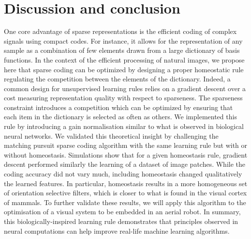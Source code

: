 \documentclass[a4paper, 11pt, draft]{article} %
\begin{document}
\section{Discussion and conclusion}\label{discussion-et-conclusion}



%
One core advantage of sparse representations is the efficient coding of complex signals using compact codes. For instance, it allows for the representation of any sample as a combination of few elements drawn from a large dictionary of basis functions. In the context of the efficient processing of natural images, we propose here that sparse coding can be optimized by designing a proper homeostatic rule regulating the competition between the elements of the dictionary. Indeed, a common design for unsupervised learning rules relies on a gradient descent over a cost measuring representation quality with respect to sparseness. The sparseness constraint introduces a competition which can be optimized by ensuring that each item in the dictionary is selected as often as others. We implemented this rule by introducing a gain normalisation similar to what is observed in biological neural networks. We validated this theoretical insight by challenging the matching pursuit sparse coding algorithm with the same learning rule but with or without homeostasis. Simulations show that for a given homeostasis rule, gradient descent performed similarly the learning of a dataset of image patches. While the coding accuracy did not vary much, including homeostasis changed qualitatively the learned features. In particular, homeostasis results in a more homogeneous set of orientation selective filters, which is closer to what is found in the visual cortex of mammals. To further validate these results, we will apply this algorithm to the optimisation of a visual system to be embedded in an aerial robot. In summary, this biologically-inspired learning rule demonstrates that principles observed in neural computations can help improve real-life machine learning algorithms.
\end{document}
